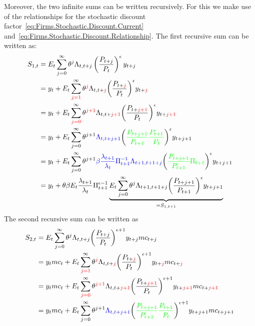 \begin{enumerate}
Moreover, the two infinite sums can be written recursively.
For this we make use of the relationships for the stochastic discount factor~\eqref{eq:Firms.Stochastic.Discount.Current} and~\eqref{eq:Firms.Stochastic.Discount.Relationship}.
The first recursive sum can be written as:
\begin{align*}
	S_{1,t} &= 
	E_t\sum_{j=0}^{\infty}\theta^j \Lambda_{t,t+j} \left(\frac{P_{t+j}}{P_t}\right)^{\epsilon} y_{t+j}
	\\
	&= y_t + E_t\sum^{\infty}_{\color{red}{j=1}}\theta^{\color{red}{j}} \Lambda_{t,t+\color{red}{j}} {\left(\frac{P_{t+\color{red}{j}}}{P_t}\right)}^{\epsilon} y_{t+\color{red}{j}}
	\\
	&= y_t + E_t\sum^{\infty}_{\color{red}{j=0}}\theta^{\color{red}{j+1}} \Lambda_{t,t+\color{red}{j+1}} {\left(\frac{P_{t+\color{red}{j+1}}}{P_t}\right)}^{\epsilon} y_{t+\color{red}{j+1}}
	\\
	&= y_t + E_t\sum^{\infty}_{j=0}\theta^{j+1} {\color{blue}{\Lambda_{t,t+j+1}}} {\left({\color{green}{\frac{P_{t+j+1}}{P_{t+1}}\frac{P_{t+1}}{P_{t}}}}\right)}^{\epsilon} y_{t+j+1}
	\\
	&= y_t + E_t\sum^{\infty}_{j=0}\theta^{j+1} {\color{blue}{\beta \frac{\lambda_{t+1}}{\lambda_t}\Pi_{t+1}^{-1} \Lambda_{t+1,t+1+j}}} {\left({\color{green}{\frac{P_{t+j+1}}{P_{t+1}}\Pi_{t+1}}}\right)}^{\epsilon} y_{t+j+1}
	\\
	&= y_t + \theta\beta E_t\frac{\lambda_{t+1}}{\lambda_t}\Pi_{t+1}^{\epsilon-1} \underbrace{E_t\sum^{\infty}_{j=0}\theta^{j} \Lambda_{t+1,t+1+j} {\left(\frac{P_{t+j+1}}{P_{t+1}}\right)}^{\epsilon} y_{t+j+1}}_{=S_{1,t+1}}
\end{align*}
The second recursive sum can be written as
\begin{align*}
	S_{2,t} &= 
	E_t\sum_{j=0}^{\infty}\theta^j \Lambda_{t,t+j} {\left(\frac{P_{t+j}}{P_t}\right)}^{\epsilon+1} y_{t+j} mc_{t+j}
	\\
	&= y_t mc_t + E_t\sum^{\infty}_{\color{red}{j=1}}\theta^{\color{red}{j}} \Lambda_{t,t+\color{red}{j}} {\left(\frac{P_{t+\color{red}{j}}}{P_t}\right)}^{\epsilon+1} y_{t+\color{red}{j}} mc_{t+\color{red}{j}}
	\\
	&= y_t mc_t + E_t\sum^{\infty}_{\color{red}{j=0}}\theta^{\color{red}{j+1}} \Lambda_{t,t+\color{red}{j+1}} {\left(\frac{P_{t+\color{red}{j+1}}}{P_t}\right)}^{\epsilon+1} y_{t+\color{red}{j+1}} mc_{t+\color{red}{j+1}}
	\\
	&= y_t mc_t + E_t\sum^{\infty}_{j=0}\theta^{j+1} {\color{blue}{\Lambda_{t,t+j+1}}} {\left({\color{green}{\frac{P_{t+j+1}}{P_{t+1}}\frac{P_{t+1}}{P_{t}}}}\right)}^{\epsilon+1} y_{t+j+1} mc_{t+j+1}

\end{align*}
\end{enumerate}
